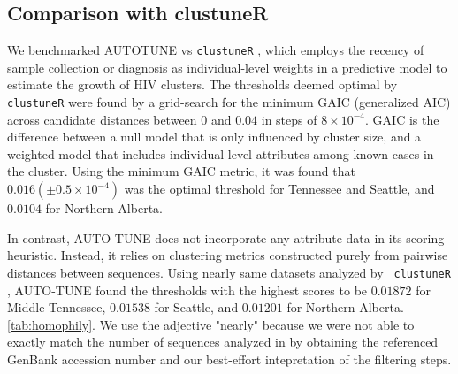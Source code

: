 \documentclass[utf8]{FrontiersinHarvard} %
\begin{document}


\subsection{Comparison with clustuneR}

We benchmarked AUTOTUNE vs {\tt clustuneR} \cite{chato_public_2020}, which employs the recency of sample
collection or diagnosis as individual-level weights in a predictive model to
estimate the growth of HIV clusters. The thresholds deemed optimal by {\tt clustuneR} were found by a grid-search for the minimum GAIC (generalized AIC) across candidate distances between $0$ and $0.04$ in steps of $8 \times 10^{-4}$. GAIC
is the difference between a null model that is only influenced by cluster size,
and a weighted model that includes individual-level attributes among known
cases in the cluster. Using the minimum GAIC metric, it was found that $0.016 (\pm  0.5\times 10^{-4})$
was the optimal threshold for Tennessee and Seattle, and $0.0104$ for Northern
Alberta.

In contrast, AUTO-TUNE does not incorporate any attribute data in its scoring
heuristic. Instead, it relies on clustering metrics constructed purely from
pairwise distances between sequences. Using nearly same datasets analyzed by {\tt
clustuneR} \citep{chato_public_2020}, AUTO-TUNE found the thresholds with the
highest scores to be $0.01872$ for Middle Tennessee, $0.01538$ for Seattle, and
$0.01201$ for Northern Alberta. \autoref{tab:homophily}. We use the adjective "nearly" because we were not able to exactly match the number of sequences analyzed in \citet{chato_public_2020} by obtaining the referenced GenBank accession number and our best-effort intepretation of the filtering steps.
\end{document}
